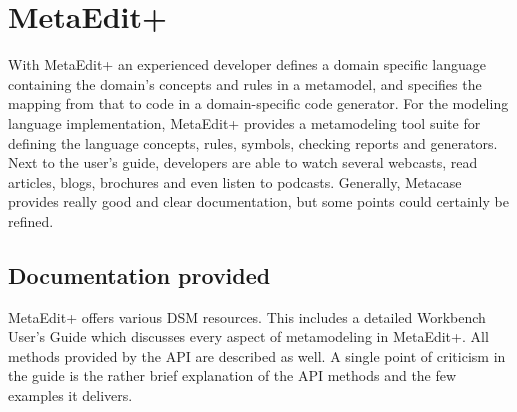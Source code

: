 \section{MetaEdit+}
With MetaEdit+ an experienced developer defines a domain specific language containing the domain’s concepts and rules in a metamodel, and specifies the mapping from that to code in a domain-specific code generator. For the modeling language implementation, MetaEdit+ provides a metamodeling tool suite for defining the language concepts, rules, symbols, checking reports and generators. Next to the user’s guide, developers are able to watch several webcasts, read articles, blogs, brochures and even listen to podcasts. Generally, Metacase provides really good and clear documentation, but some points could certainly be refined.

\subsection{Documentation provided}
MetaEdit+ offers various DSM resources. This includes a detailed Workbench User’s Guide which discusses every aspect of metamodeling in MetaEdit+. All methods provided by the API are described as well. A single point of criticism in the guide is the rather brief explanation of the API methods and the few examples it delivers.